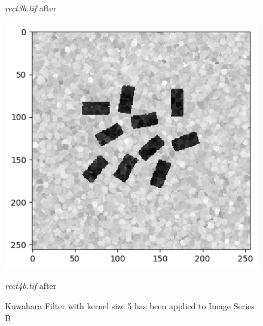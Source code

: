 \documentclass[runningheads]{llncs}
\begin{document}
\begin{figure}[h!]
\begin{minipage}[h]{0.47\linewidth}
\begin{center}
\caption{\emph{rect3b.tif} after}
\label{kb7-Kuwahara and Kernel 5}
\end{center}
\end{minipage}
\hfill
\begin{minipage}[h]{0.47\linewidth}
\begin{center}
\includegraphics[width=1\linewidth]{Report/Result_Images/image_kb8.png} 
\caption{\emph{rect4b.tif} after}
\label{kb8-Kuwahara and Kernel 5}
\end{center}
\end{minipage}
\caption*{Kuwahara Filter with kernel size 5 has been applied to Image Series B}
\label{kb5-8 Kuwahara5}
\end{figure}
\newpage
\end{document}
